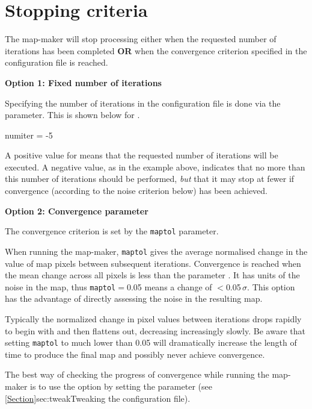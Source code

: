 \documentclass[11pt,oneside,chapters]{starlink}
\begin{document}
\section{Stopping criteria}
\label{sec:converge}

The map-maker will stop processing either when the requested number of
iterations has been completed \textbf{OR} when the convergence
criterion specified in the configuration file is reached.


\textbf{Option 1: Fixed number of iterations}

Specifying the number of iterations in the configuration file is done
via the  parameter. This is shown below for
.

\begin{terminalv}
numiter = -5
\end{terminalv}

A positive value for  means that the requested number
of iterations will be executed. A negative value, as in the example
above, indicates that no more than this number of iterations should be
performed, \emph{but} that it may stop at fewer if convergence
(according to the noise criterion below) has been achieved.

\textbf{Option 2: Convergence parameter}

The convergence criterion is set by the \texttt{maptol} parameter.

When running the map-maker, \texttt{maptol} gives the average
normalised change in the value of map pixels
between subsequent iterations. Convergence is reached when the  mean
change across all pixels is less than the parameter .
It has units of the noise
in the map, thus \texttt{maptol}$=$0.05 means a change of
$<$0.05\,$\sigma$. This option has the advantage of directly assessing
the noise in the resulting map.

Typically the normalized change in pixel values between iterations
drops rapidly to begin with and then flattens out, decreasing
increasingly slowly.  Be aware that setting \texttt{maptol} to much
lower than 0.05 will dramatically increase the length of time to
produce the final map and possibly never achieve convergence.

The best way of checking the progress of convergence while running the
map-maker is to use the  option by setting the parameter
 (see \cref{Section}{sec:tweak}{Tweaking the
configuration file}).
\end{document}
